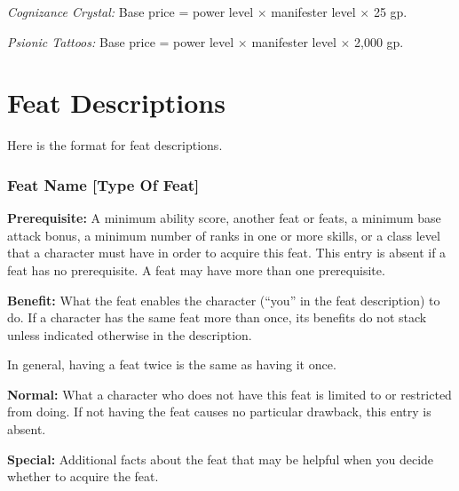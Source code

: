 \textit{Cognizance Crystal:} Base price = power level $\times$ manifester level $\times$ 25 gp.

\textit{Psionic Tattoos:} Base price = power level $\times$ manifester level $\times$ 2,000 gp.






\section{Feat Descriptions}
Here is the format for feat descriptions.

\subsubsection{Feat Name {\normalsize[Type Of Feat]}}
\textbf{Prerequisite:} A minimum ability score, another feat or feats, a minimum base attack bonus, a minimum number of ranks in one or more skills, or a class level that a character must have in order to acquire this feat. This entry is absent if a feat has no prerequisite. A feat may have more than one prerequisite.

\textbf{Benefit:} What the feat enables the character (``you'' in the feat description) to do. If a character has the same feat more than once, its benefits do not stack unless indicated otherwise in the description.

In general, having a feat twice is the same as having it once.

\textbf{Normal:} What a character who does not have this feat is limited to or restricted from doing. If not having the feat causes no particular drawback, this entry is absent.

\textbf{Special:} Additional facts about the feat that may be helpful when you decide whether to acquire the feat.






% 










